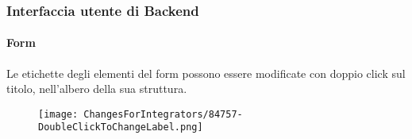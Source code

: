 
\begin{frame}[fragile]
	\frametitle{Interfaccia utente di Backend}
	\framesubtitle{Form}

	\lstset{basicstyle=\tiny\ttfamily}

	Le etichette degli elementi del form possono essere modificate con doppio click sul titolo, nell'albero della sua struttura.

	\begin{figure}
		\texttt{[image: ChangesForIntegrators/84757-DoubleClickToChangeLabel.png]}
	\end{figure}

\end{frame}

